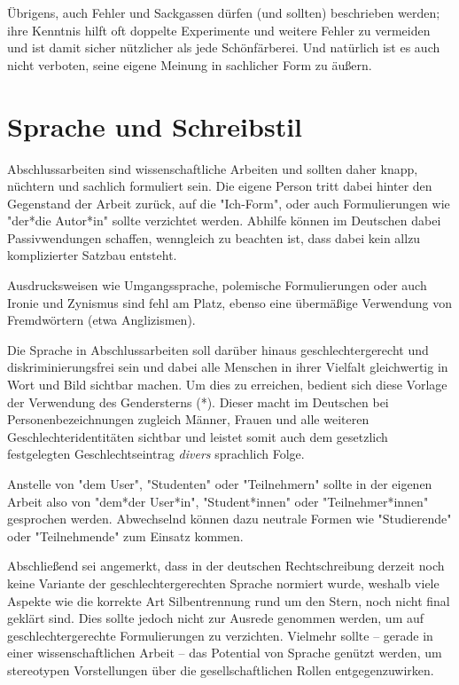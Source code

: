 Übrigens, auch Fehler und Sackgassen dürfen (und sollten)
beschrieben werden; ihre Kenntnis hilft oft doppelte Experimente und
weitere Fehler zu vermeiden und ist damit sicher nützlicher als
jede Schönfärberei.
Und natürlich ist es auch nicht verboten, seine eigene Meinung 
in sachlicher Form zu äußern.


\section{Sprache und Schreibstil}

Abschlussarbeiten sind wissenschaftliche Arbeiten und sollten daher knapp,
nüchtern und sachlich formuliert sein. Die eigene Person tritt dabei hinter
den Gegenstand der Arbeit zurück, auf die "Ich-Form", oder auch Formulierungen
wie "der*die Autor*in" sollte verzichtet werden. Abhilfe können im Deutschen
dabei Passivwendungen schaffen, wenngleich zu beachten ist, dass dabei kein
allzu komplizierter Satzbau entsteht.

Ausdrucksweisen wie Umgangssprache, polemische Formulierungen oder auch
Ironie und Zynismus sind fehl am Platz, ebenso eine übermäßige Verwendung von
Fremdwörtern (etwa Anglizismen).

Die Sprache in Abschlussarbeiten soll darüber hinaus geschlechtergerecht und
diskriminierungsfrei sein und dabei alle Menschen in ihrer Vielfalt gleichwertig
in Wort und Bild sichtbar machen. Um dies zu erreichen, bedient sich diese
Vorlage der Verwendung des Gendersterns (*). Dieser macht im Deutschen bei
Personenbezeichnungen zugleich Männer, Frauen und alle weiteren
Geschlechteridentitäten sichtbar und leistet somit auch dem gesetzlich
festgelegten Geschlechtseintrag \emph{divers} sprachlich Folge.

Anstelle von "dem User", "Studenten" oder "Teilnehmern" sollte in der eigenen
Arbeit also von "dem*der User*in", "Student*innen" oder "Teilnehmer*innen"
gesprochen werden. Abwechselnd können dazu neutrale Formen wie "Studierende" oder
"Teilnehmende" zum Einsatz kommen.

Abschließend sei angemerkt, dass in der deutschen Rechtschreibung derzeit noch
keine Variante der geschlechtergerechten Sprache normiert wurde, weshalb viele
Aspekte wie die korrekte Art Silbentrennung rund um den Stern, noch nicht final
geklärt sind. Dies sollte jedoch nicht zur Ausrede genommen werden, um auf
geschlechtergerechte Formulierungen zu verzichten. Vielmehr sollte -- gerade in
einer wissenschaftlichen Arbeit -- das Potential von Sprache genützt werden, um
stereotypen Vorstellungen über die gesellschaftlichen Rollen entgegenzuwirken.


